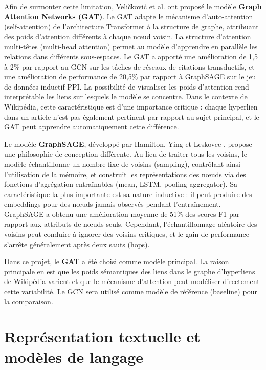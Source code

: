 Afin de surmonter cette limitation, Veličković et al.\@ \cite{velickovic2018graph} ont proposé le modèle \textbf{Graph Attention Networks (GAT)}. Le GAT adapte le mécanisme d'auto-attention (self-attention) de l'architecture Transformer à la structure de graphe, attribuant des poids d'attention différents à chaque n\oe ud voisin. La structure d'attention multi-têtes (multi-head attention) permet au modèle d'apprendre en parallèle les relations dans différents sous-espaces. Le GAT a apporté une amélioration de 1,5 à 2\% par rapport au GCN sur les tâches de réseaux de citations transductifs, et une amélioration de performance de 20,5\% par rapport à GraphSAGE sur le jeu de données inductif PPI. La possibilité de visualiser les poids d'attention rend interprétable les liens sur lesquels le modèle se concentre. Dans le contexte de Wikipédia, cette caractéristique est d'une importance critique : chaque hyperlien dans un article n'est pas également pertinent par rapport au sujet principal, et le GAT peut apprendre automatiquement cette différence.

Le modèle \textbf{GraphSAGE}, développé par Hamilton, Ying et Leskovec \cite{hamilton2017inductive}, propose une philosophie de conception différente. Au lieu de traiter tous les voisins, le modèle échantillonne un nombre fixe de voisins (sampling), contrôlant ainsi l'utilisation de la mémoire, et construit les représentations des n\oe uds via des fonctions d'agrégation entraînables (mean, LSTM, pooling aggregator). Sa caractéristique la plus importante est sa nature inductive : il peut produire des embeddings pour des n\oe uds jamais observés pendant l'entraînement. GraphSAGE a obtenu une amélioration moyenne de 51\% des scores F1 par rapport aux attributs de nœuds seuls. Cependant, l'échantillonnage aléatoire des voisins peut conduire à ignorer des voisins critiques, et le gain de performance s'arrête généralement après deux sauts (hops).

Dans ce projet, le \textbf{GAT} a été choisi comme modèle principal. La raison principale en est que les poids sémantiques des liens dans le graphe d'hyperliens de Wikipédia varient et que le mécanisme d'attention peut modéliser directement cette variabilité. Le GCN sera utilisé comme modèle de référence (baseline) pour la comparaison.

\section{Représentation textuelle et modèles de langage}

